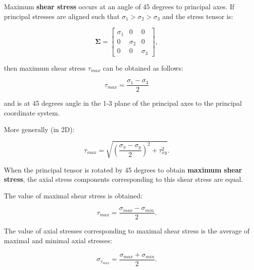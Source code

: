 \begin{itemize}
        Maximum \textbf{shear stress} occurs at an angle of 45 degrees to principal axes.
        If principal stresses are aligned such that $\sigma_1 > \sigma_2 > \sigma_3$
        and the stress tensor is:

        \begin{equation}
            \mathbf{\Sigma} = \begin{bmatrix}
                \sigma_1 & 0 & 0 \\
                0 & \sigma_2 & 0 \\
                0 & 0 & \sigma_3
            \end{bmatrix}
        ,\end{equation}

        then maximum shear stress $\tau_{max}$ can be obtained as follows:

        \begin{equation}
            \tau_{max} = \frac{\sigma_1 - \sigma_3}{2}
        \end{equation}

        and is at 45 degrees angle in the 1-3 plane of the principal axes to the
        principal coordinate system.

        More generally (in 2D):

        \begin{equation}
            \tau_{max} = \sqrt{\left(\frac{\sigma_{x} - \sigma_{y}}{2}\right)^{2}
            + \tau_{xy}^{2}}
        .\end{equation}

        \begin{bbox}[0.85]
            When the principal tensor is rotated by 45 degrees to obtain \textbf{maximum
            shear stress}, the axial stress components corresponding to this shear
            stress are equal.

            The value of maximal shear stress is obtained:

            \begin{equation}
                \tau_{max} = \frac{\sigma_{max} - \sigma_{min}}{2}
            .\end{equation}

            The value of axial stresses corresponding to maximal shear stress is
            the average of maximal and minimal axial stresses:

            \begin{equation}
                \sigma_{\tau_{max}} = \frac{\sigma_{max} + \sigma_{min}}{2}
            .\end{equation}


\end{bbox}
\end{itemize}
